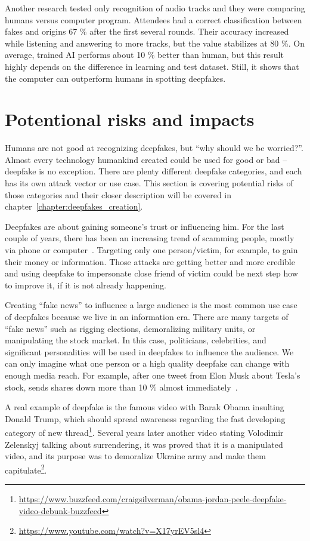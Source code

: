 Another research tested only recognition of audio tracks and they were comparing humans versus computer program. Attendees had a correct classification between fakes and origins 67 \% after the first several rounds. Their accuracy increased while listening and answering to more tracks, but the value stabilizes at 80 \%. On average, trained AI performs about 10 \% better than human, but this result highly depends on the difference in learning and test dataset. Still, it shows that the computer can outperform humans in spotting deepfakes. \cite{HumanPerceptionAudio}

\section{Potentional risks and impacts}

Humans are not good at recognizing deepfakes, but “why should we be worried?”. Almost every technology humankind created could be used for good or bad – deepfake is no exception. There are plenty different deepfake categories, and each has its own attack vector or use case. This section is covering potential risks of those categories and their closer description will be covered in chapter~\ref{chapter:deepfakes_creation}.

Deepfakes are about gaining someone’s trust or influencing him. For the last couple of years, there has been an increasing trend of scamming people, mostly via phone or computer~\cite{HybridVishingAttacksSkyrocketing}. Targeting only one person/victim, for example, to gain their money or information. Those attacks are getting better and more credible and using deepfake to impersonate close friend of victim could be next step how to improve it, if it is not already happening.

Creating “fake news” to influence a large audience is the most common use case of deepfakes because we live in an information era. There are many targets of “fake news” such as rigging elections, demoralizing military units, or manipulating the stock market. In this case, politicians, celebrities, and significant personalities will be used in deepfakes to influence the audience. We can only imagine what one person or a high quality deepfake can change with enough media reach. For example, after one tweet from Elon Musk about Tesla’s stock, sends shares down more than 10 \% almost immediately~\cite{ElonMusksTweets}.~\cite{IncreasingThreatofDeepfakeIdentites}

A real example of deepfake is the famous video with Barak Obama insulting Donald Trump, which should spread awareness regarding the fast developing category of new thread\footnote{\url{https://www.buzzfeed.com/craigsilverman/obama-jordan-peele-deepfake-video-debunk-buzzfeed}}. Several years later another video stating Volodimir Zelenskyj talking about surrendering, it was proved that it is a manipulated video, and its purpose was to demoralize Ukraine army and make them capitulate\footnote{\url{https://www.youtube.com/watch?v=X17yrEV5sl4}}.

